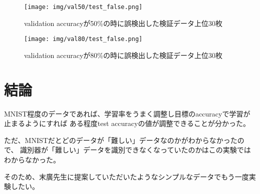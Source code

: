 \documentclass[12pt]{article}
\begin{document}
\begin{figure}[H]
    \centering
    \texttt{[image: img/val50/test\_false.png]}
    \caption{validation accuracyが50\%の時に誤検出した検証データ上位30枚}
\end{figure}

\begin{figure}[H]
    \centering
    \texttt{[image: img/val80/test\_false.png]}
    \caption{validation accuracyが80\%の時に誤検出した検証データ上位30枚}
\end{figure}

\section{結論}

MNIST程度のデータであれば、学習率をうまく調整し目標のaccuracyで学習が止まるようにすれば
ある程度test accuracyの値が調整できることが分かった。

ただ、MNISTだとどのデータが「難しい」データなのかがわからなかったので、
識別器が「難しい」データを識別できなくなっていたのかはこの実験ではわからなかった。

そのため、末廣先生に提案していただいたようなシンプルなデータでもう一度実験したい。
\end{document}
